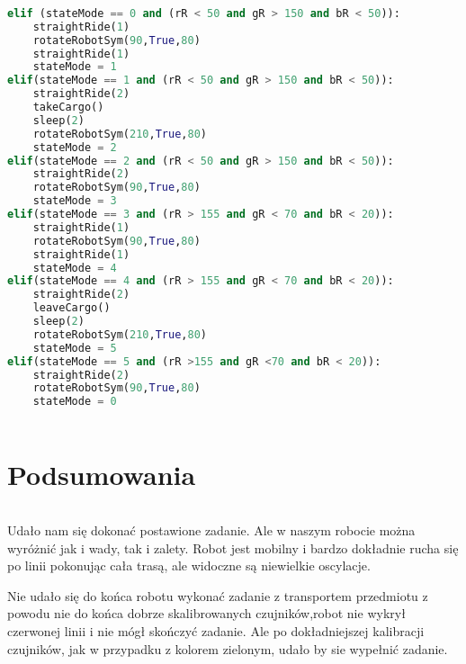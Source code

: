 \documentclass[12pt,a4paper]{report}
\begin{document}
    \begin{lstlisting}[language=Python]
    			
elif (stateMode == 0 and (rR < 50 and gR > 150 and bR < 50)):
	straightRide(1)
	rotateRobotSym(90,True,80)					
	straightRide(1)
	stateMode = 1
elif(stateMode == 1 and (rR < 50 and gR > 150 and bR < 50)): 
	straightRide(2)
	takeCargo()
	sleep(2)
	rotateRobotSym(210,True,80)
	stateMode = 2
elif(stateMode == 2 and (rR < 50 and gR > 150 and bR < 50)):
	straightRide(2)
	rotateRobotSym(90,True,80)
	stateMode = 3
elif(stateMode == 3 and (rR > 155 and gR < 70 and bR < 20)):
	straightRide(1)
	rotateRobotSym(90,True,80)
	straightRide(1)
	stateMode = 4
elif(stateMode == 4 and (rR > 155 and gR < 70 and bR < 20)):
	straightRide(2)
	leaveCargo()
	sleep(2)
	rotateRobotSym(210,True,80)
	stateMode = 5
elif(stateMode == 5 and (rR >155 and gR <70 and bR < 20)):
	straightRide(2)
	rotateRobotSym(90,True,80)
	stateMode = 0
			
 \end{lstlisting}
      
    \chapter{Podsumowania}
   	\subparagraph{}
      	Udało nam się dokonać postawione zadanie. Ale w naszym robocie można wyróżnić jak i wady, tak i zalety. Robot jest mobilny i  bardzo dokładnie rucha się po linii pokonując cała trasą, ale widoczne są niewielkie oscylacje.
    
    	 	Nie udało się do końca robotu wykonać zadanie z transportem przedmiotu z powodu nie do końca dobrze skalibrowanych czujników,robot nie wykrył czerwonej linii i nie mógł skończyć zadanie. Ale po dokładniejszej kalibracji czujników, jak w przypadku z kolorem zielonym, udało by sie wypełnić zadanie. 
 
\end{document}

